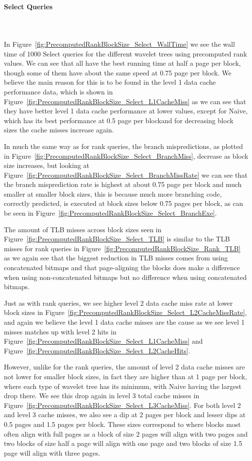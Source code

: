 \paragraph{Select Queries}~\\\\
In Figure~\ref{fig:PrecomputedRankBlockSize_Select_WallTime} we see the wall time of 1000 Select queries for the different wavelet trees using precomputed rank values.
We can see that all have the best running time at half a page per block, though some of them have about the same speed at 0.75 page per block.
We believe the main reason for this is to be found in the level 1 data cache performance data, which is shown in Figure~\ref{fig:PrecomputedRankBlockSize_Select_L1CacheMiss} as we can see that they have better level 1 data cache performance at lower values, except for Naive, which has its best performance at 0.5 page per blockand for decreasing block sizes the cache misses increase again.

In much the same way as for rank queries, the branch mispredictions, as plotted in Figure~\ref{fig:PrecomputedRankBlockSize_Select_BranchMiss}, decrease as block size increases, but looking at Figure~\ref{fig:PrecomputedRankBlockSize_Select_BranchMissRate} we can see that the branch misprediction rate is highest at about 0.75 page per block and much smaller at smaller block sizes, this is because much more branching code, correctly predicted, is executed at block sizes below 0.75 pages per block, as can be seen in Figure~\ref{fig:PrecomputedRankBlockSize_Select_BranchExe}.

The amount of TLB misses across block sizes seen in Figure~\ref{fig:PrecomputedRankBlockSize_Select_TLB} is similar to the TLB misses for rank queries in Figure~\ref{fig:PrecomputedRankBlockSize_Rank_TLB} as we again see that the biggest reduction in TLB misses comes from using concatenated bitmaps and that page-aligning the blocks does make a difference when using non-concatenated bitmaps but no difference when using concatenated bitmaps.

Just as with rank queries, we see higher level 2 data cache miss rate at lower block sizes in Figure~\ref{fig:PrecomputedRankBlockSize_Select_L2CacheMissRate}, and again we believe the level 1 data cache misses are the cause as we see level 1 misses matches up with level 2 hits in Figure~\ref{fig:PrecomputedRankBlockSize_Select_L1CacheMiss} and Figure~\ref{fig:PrecomputedRankBlockSize_Select_L2CacheHits}.

However, unlike for the rank queries, the amount of level 2 data cache misses are not lower for smaller block sizes, in fact they are higher than at 1 page per block, where each type of wavelet tree has its minimum, with Naive having the largest drop there.
We see this drop again in level 3 total cache misses in Figure~\ref{fig:PrecomputedRankBlockSize_Select_L3CacheMiss}.
For both level 2 and level 3 cache misses, we also see a dip at 2 pages per block and lesser dips at 0.5 pages and 1.5 pages per block. 
These sizes correspond to where blocks most often align with full pages as a block of size 2 pages will align with two pages and two blocks of size half a page will align with one page and two blocks of size 1.5 page will align with three pages.

